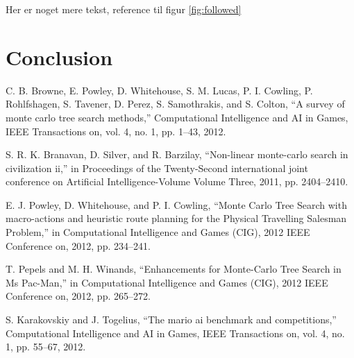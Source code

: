\documentclass[10pt,a4paper]{article}
\begin{document}
Her er noget mere tekst, reference til figur \ref{fig:followed}
\clearpage
\section{Conclusion}
\clearpage

\begin{thebibliography}{9} %
  C. B. Browne, E. Powley, D. Whitehouse, S. M. Lucas, P. I. Cowling, P. Rohlfshagen, S. Tavener, D. Perez, S. Samothrakis, and S. Colton, “A survey of monte carlo tree search methods,” Computational Intelligence and AI in Games, IEEE Transactions on, vol. 4, no. 1, pp. 1–43, 2012.

S. R. K. Branavan, D. Silver, and R. Barzilay, “Non-linear monte-carlo search in civilization ii,” in Proceedings of the Twenty-Second international joint conference on Artificial Intelligence-Volume Volume Three, 2011, pp. 2404–2410.

E. J. Powley, D. Whitehouse, and P. I. Cowling, “Monte Carlo Tree Search with macro-actions and heuristic route planning for the Physical Travelling Salesman Problem,” in Computational Intelligence and Games (CIG), 2012 IEEE Conference on, 2012, pp. 234–241.

T. Pepels and M. H. Winands, “Enhancements for Monte-Carlo Tree Search in Ms Pac-Man,” in Computational Intelligence and Games (CIG), 2012 IEEE Conference on, 2012, pp. 265–272.

S. Karakovskiy and J. Togelius, “The mario ai benchmark and competitions,” Computational Intelligence and AI in Games, IEEE Transactions on, vol. 4, no. 1, pp. 55–67, 2012.

\end{thebibliography}
\end{document}
